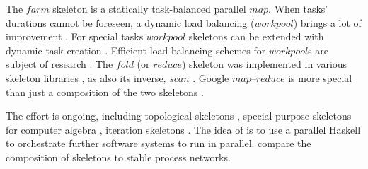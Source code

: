 \documentclass{jfp1}
\newcommand{\Varid}[1]{\mathit{#1}}
\renewcommand{\cite}[1]{\citep{#1}}
\begin{document}
The \ensuremath{\Varid{farm}} skeleton \citep{Hey1990185,Eden:PPDP01,Kuchen05} is a statically task-balanced parallel \ensuremath{\Varid{map}}. When tasks' durations cannot be foreseen, a dynamic load balancing (\ensuremath{\Varid{workpool}}) brings a lot of improvement \citep{Rudolph:1991:SLB:113379.113401,doi:10.1142/S0129626403001380,Hippold2006,PADL08HMWS,Marlow2009}. For special tasks \ensuremath{\Varid{workpool}} skeletons can be extended with dynamic task creation \cite{WPEuropar06,Dinan:2009:SWS:1654059.1654113,brown2010ever}. Efficient load-balancing schemes for \ensuremath{\Varid{workpool}}s are subject of research \cite{Blumofe:1999:SMC:324133.324234,Acar:2000:DLW:341800.341801,vanNieuwpoort:2001:ELB:568014.379563,Chase:2005:DCW:1073970.1073974,4625841,Michael:2009:IWS:1594835.1504186}.
%
The \ensuremath{\Varid{fold}} (or \ensuremath{\Varid{reduce}}) skeleton was implemented in various skeleton libraries \cite{Kuchen2002,5361825,BUONO20102095,Dastgeer:2011:ASM:1984693.1984697}, as also its inverse, \ensuremath{\Varid{scan}} \cite{Bischof2002,harris2007parallel}.
%
Google \ensuremath{\Varid{map}}--\ensuremath{\Varid{reduce}} \cite{Dean:2008:MSD:1327452.1327492,Dean:2010:MFD:1629175.1629198} is more special than just a composition of the two skeletons \cite{LAMMEL20081,Berthold2009-mr}.

The effort is ongoing, including topological skeletons \cite{Eden:PARCO05}, special-purpose skeletons for computer algebra \cite{Berthold2009-fft,lobachev-phd,Lobachev2012,janjic2013space}, iteration skeletons \cite{Dieterle2013}. The idea of \citet{scscp} is to use a parallel Haskell to orchestrate further software systems to run in parallel. \citet{dieterle_horstmeyer_loogen_berthold_2016} compare the composition of skeletons to stable process networks.
\end{document}
